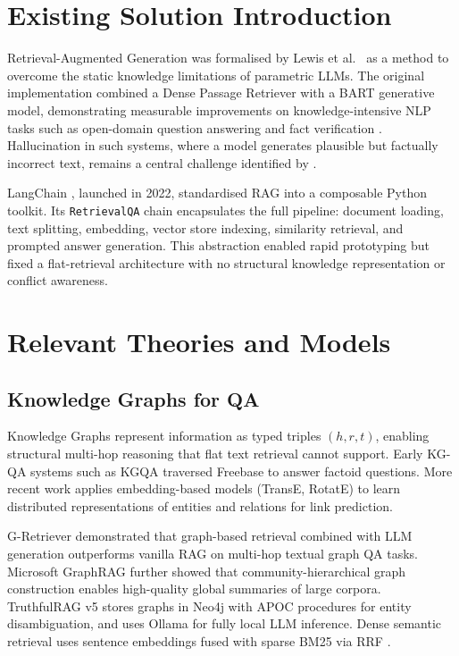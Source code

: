 

\section{Existing Solution Introduction}

Retrieval-Augmented Generation was formalised by Lewis et al.\ \cite{lewis2020rag}
as a method to overcome the static knowledge limitations of parametric LLMs. The
original implementation combined a Dense Passage Retriever with a BART generative
model, demonstrating measurable improvements on knowledge-intensive NLP tasks
such as open-domain question answering and fact verification \cite{gao2023ragsurvey}.
Hallucination in such systems, where a model generates plausible but factually incorrect
text, remains a central challenge identified by \cite{ji2023survey}.

LangChain \cite{chase2022langchain}, launched in 2022, standardised RAG into a
composable Python toolkit. Its \texttt{RetrievalQA} chain encapsulates the full
pipeline: document loading, text splitting, embedding, vector store indexing,
similarity retrieval, and prompted answer generation. This abstraction enabled
rapid prototyping but fixed a flat-retrieval architecture with no structural
knowledge representation or conflict awareness.

\section{Relevant Theories and Models}

\subsection{Knowledge Graphs for QA}

Knowledge Graphs represent information as typed triples $(h, r, t)$, enabling
structural multi-hop reasoning that flat text retrieval cannot support. Early KG-QA
systems such as KGQA \cite{pagerank1998} traversed Freebase to answer factoid
questions. More recent work applies embedding-based models (TransE, RotatE) to
learn distributed representations of entities and relations for link prediction.

G-Retriever \cite{he2024gretriever} demonstrated that graph-based retrieval
combined with LLM generation outperforms vanilla RAG on multi-hop textual graph
QA tasks. Microsoft GraphRAG \cite{edge2024graphrag} further showed that
community-hierarchical graph construction enables high-quality global summaries
of large corpora. TruthfulRAG v5 stores graphs in Neo4j with APOC procedures
\cite{neo4japoc2023} for entity disambiguation, and uses Ollama \cite{ollama2023}
for fully local LLM inference. Dense semantic retrieval uses sentence embeddings
\cite{reimers2019sbert} fused with sparse BM25 \cite{robertson2009bm25} via RRF \cite{rrf2009}.

